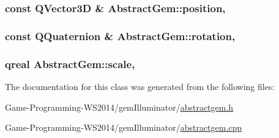 \subsubsection[{position}]{\setlength{\rightskip}{0pt plus 5cm}const Q\+Vector3\+D \& Abstract\+Gem\+::position\hspace{0.3cm}{\ttfamily [read]}, {\ttfamily [write]}}\label{class_abstract_gem_accd665898ada9bc95c886bfbcf56d9a8}
\hypertarget{class_abstract_gem_a6d85928549d64d369864716dbe2c716b}{}
\subsubsection[{rotation}]{\setlength{\rightskip}{0pt plus 5cm}const Q\+Quaternion \& Abstract\+Gem\+::rotation\hspace{0.3cm}{\ttfamily [read]}, {\ttfamily [write]}}\label{class_abstract_gem_a6d85928549d64d369864716dbe2c716b}
\hypertarget{class_abstract_gem_a71c3b2720a5e3da61741f9043427ab51}{}
\subsubsection[{scale}]{\setlength{\rightskip}{0pt plus 5cm}qreal Abstract\+Gem\+::scale\hspace{0.3cm}{\ttfamily [read]}, {\ttfamily [write]}}\label{class_abstract_gem_a71c3b2720a5e3da61741f9043427ab51}


The documentation for this class was generated from the following files\+:\begin{DoxyCompactItemize}
\item 
Game-\/\+Programming-\/\+W\+S2014/gem\+Illuminator/\hyperlink{abstractgem_8h}{abstractgem.\+h}\item 
Game-\/\+Programming-\/\+W\+S2014/gem\+Illuminator/\hyperlink{abstractgem_8cpp}{abstractgem.\+cpp}\end{DoxyCompactItemize}
